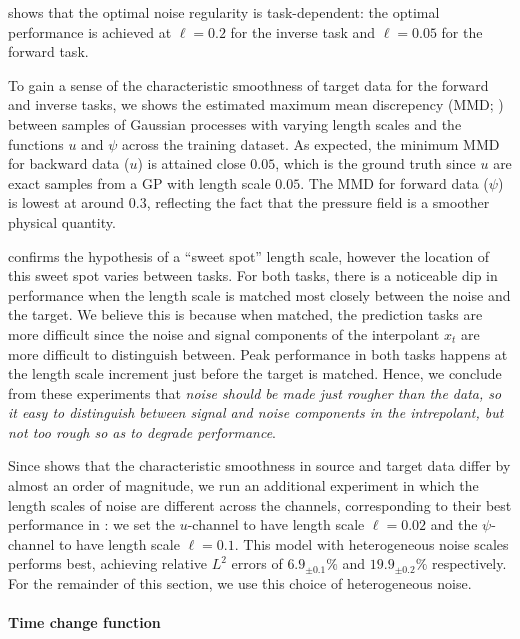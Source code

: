  shows that the optimal noise regularity is task-dependent: the optimal performance is achieved at  \(\ell = 0.2\) for the inverse task and \(\ell = 0.05\) for the forward task.

To gain a sense of the characteristic smoothness of target data for the forward and inverse tasks, we  shows the estimated maximum mean discrepency (MMD; \citealp{gretton2012kernel}) between samples of Gaussian processes with varying length scales and the functions \(u\) and \(\psi\) across the training dataset. As expected, the minimum MMD for backward data (\(u\)) is attained close  \(0.05\), which is the ground truth since \(u\) are exact samples from a GP with length scale \(0.05\). The MMD for forward data (\(\psi\)) is lowest at around \(0.3\), reflecting the fact that the pressure field is a smoother physical quantity.

 confirms the hypothesis of a ``sweet spot'' length scale, however the location of this sweet spot varies between tasks. For both tasks, there is a noticeable dip in performance when the length scale is matched most closely between the noise and the target. We believe this is because when matched, the prediction tasks are more difficult since the noise and signal components of the interpolant \(x_{t}\) are more difficult to distinguish between. Peak performance in both tasks happens at the length scale increment just before the target is matched. Hence, we conclude from these experiments that \textit{noise should be made just rougher than the data, so it easy to distinguish between signal and noise components in the intrepolant, but not too rough so as to degrade performance}.

Since  shows that the characteristic smoothness in source and target data differ by almost an order of magnitude, we run an additional experiment in which the length scales of noise are different across the channels, corresponding to their best performance in : we set the \(u\)-channel to have length scale \(\ell=0.02\) and the \(\psi\)-channel to have length scale \(\ell=0.1\). This model with heterogeneous noise scales performs best, achieving relative \(L^{2}\) errors of \(6.9_{\pm 0.1}\%\) and \(19.9_{\pm0.2}\%\) respectively. For the remainder of this section, we use this choice of heterogeneous noise.

\paragraph{Time change function}

